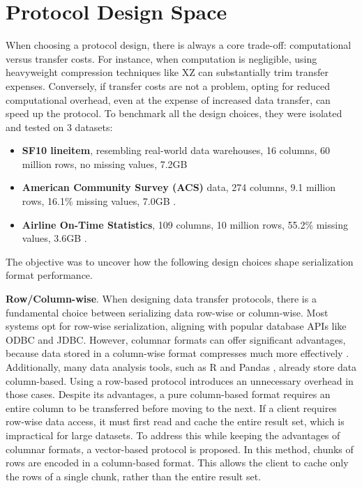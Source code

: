 \documentclass[sigconf]{acmart}
\begin{document}
\section{Protocol Design Space}
When choosing a protocol design, there is always a core trade-off: computational versus transfer costs. For instance, when computation is negligible, using heavyweight compression techniques like XZ \cite{salomon2006datacompression} can substantially trim transfer expenses. Conversely, if transfer costs are not a problem, opting for reduced computational overhead, even at the expense of increased data transfer, can speed up the protocol.
To benchmark all the design choices, they were isolated and tested on 3 datasets:
\begin{itemize}
  \item \textbf{SF10 lineitem}, resembling real-world data warehouses, 16 columns, 60 million rows, no missing values, 7.2GB
  \item \textbf{American Community Survey (ACS)} data, 274 columns, 9.1 million rows, 16.1\% missing values, 7.0GB \cite{usc2014americancensus}.
  \item \textbf{Airline On-Time Statistics}, 109 columns, 10 million rows, 55.2\% missing values, 3.6GB \cite{dot2016airlineontime}.
\end{itemize}
The objective was to uncover how the following design choices shape serialization format performance.

\textbf{Row/Column-wise}. 
When designing data transfer protocols, there is a fundamental choice between serializing data row-wise or column-wise. Most systems opt for row-wise serialization, aligning with popular database APIs like ODBC and JDBC. However, columnar formats can offer significant advantages, because data stored in a column-wise format compresses much more effectively \cite{abadi2006integrating}. Additionally, many data analysis tools, such as R \cite{rcore2016} and Pandas \cite{mckinney2010data}, already store data column-based. Using a row-based protocol introduces an unnecessary overhead in those cases.
Despite its advantages, a pure column-based format requires an entire column to be transferred before moving to the next. If a client requires row-wise data access, it must first read and cache the entire result set, which is impractical for large datasets.
To address this while keeping the advantages of columnar formats, a vector-based protocol is proposed. In this method, chunks of rows are encoded in a column-based format. This allows the client to cache only the rows of a single chunk, rather than the entire result set.
\end{document}
